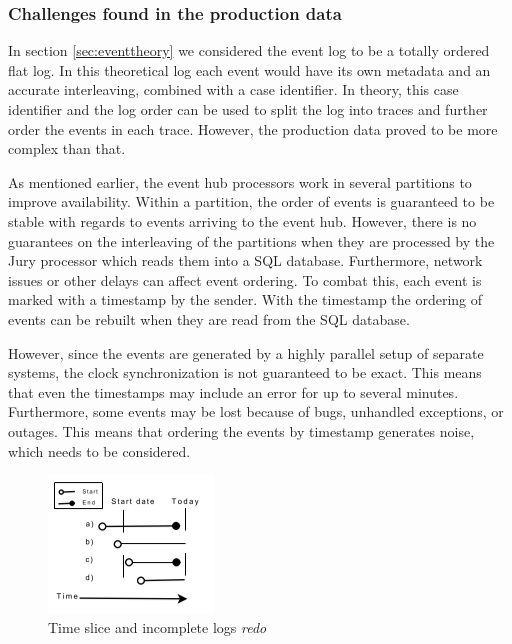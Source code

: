 \documentclass[english,12pt,a4paper,pdftex,sci,utf8]{aaltothesis}
\theoremstyle{definition}
\newcommand{\nyi}[1]{\noindent\colorbox{nyibg}{\textcolor{nyitext}{\emph{#1}}}}
\begin{document}
\subsubsection{Challenges found in the production data}

In section \ref{sec:eventtheory} we considered the event log to be a totally ordered flat log. In this theoretical log each event would have its own metadata and an accurate interleaving, combined with a case identifier.
In theory, this case identifier and the log order can be used to split the log into traces and further order the events in each trace.
However, the production data proved to be more complex than that. 

As mentioned earlier, the event hub processors work in several partitions to improve availability.
Within a partition, the order of events is guaranteed to be stable with regards to events arriving to the event hub. However, there is no guarantees on the interleaving of the partitions when they are processed by the Jury processor which reads them into a SQL database. 
Furthermore, network issues or other delays can affect event ordering. To combat this, each event is marked with a timestamp by the sender. With the timestamp the ordering of events can be rebuilt when they are read from the SQL database.

However, since the events are generated by a highly parallel setup of separate systems, the clock synchronization is not guaranteed to be exact. This means that even the timestamps may include an error for up to several minutes.
Furthermore, some events may be lost because of bugs, unhandled exceptions, or outages.
This means that ordering the events by timestamp generates noise, which needs to be considered.

\begin{figure}[htb]
\centering \includegraphics[width=0.5\linewidth]{gfx/slice.png}
\caption{Time slice and incomplete logs \nyi{redo}}
\label{fig:timeslice}
\end{figure}
\end{document}
